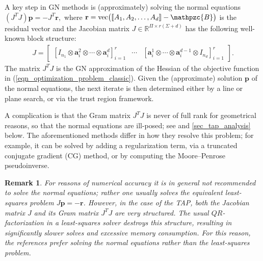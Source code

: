 \documentclass[a4paper,10pt,final]{siamart1116}
\newcommand{\tensor}[1]{\mathpzc{#1}}
\newcommand{\vect}[1]{\mathbf{#1}}
\newcommand{\sten}[3]{\vect{#1}_{#2}^{#3}}
\newcommand{\R}{\mathbb{R}}
\newcommand{\refeqn}[1]{{(\ref{#1})}}
\newcommand{\refsec}[1]{{\cref{#1}}}
\newtheorem{remark}[theorem]{Remark}
\numberwithin{equation}{section}
\numberwithin{figure}{section}
\numberwithin{table}{section}
\numberwithin{theorem}{section}
\begin{document}
A key step in GN methods is (approximately) solving the normal equations
\(
 (J^T J) \vect{p} = -J^T \vect{r},
\)
where $\vect{r} = \operatorname{vec}\bigl( {\text\textlbrackdbl} A_1, A_2, \ldots, A_d {\text\textrbrackdbl} - \tensor{B} \bigr)$ is the residual vector and the Jacobian matrix $J \in \R^{\Pi \times r(\Sigma+d)}$ has the following well-known block structure:
\begin{align}\label{eqn_overparam_jacobian}
J =
\begin{bmatrix}
[I_{n_1} \otimes \sten{a}{i}{2} \otimes \cdots \otimes \sten{a}{i}{d}]_{i=1}^r & \cdots & [\sten{a}{i}{1} \otimes \cdots \otimes \sten{a}{i}{d-1} \otimes I_{n_d}]_{i=1}^r
\end{bmatrix}.
\end{align}
The matrix $J^T J$ is the GN approximation of the Hessian of the objective function in \refeqn{eqn_optimization_problem_classic}. Given the (approximate) solution $\vect{p}$ of the normal equations, the next iterate is then determined either by a line or plane search, or via the trust region framework.

A complication is that the Gram matrix $J^TJ$ is never of full rank for geometrical reasons, so that the normal equations are ill-posed; see \cite[section 2]{V2017} and \refsec{sec_tap_analysis} below. The aforementioned methods differ in how they resolve this problem; for example, it can be solved by adding a regularization term, via a truncated conjugate gradient (CG) method, or by computing the Moore--Penrose pseudoinverse.

\begin{remark}\label{rem_numerical_accuracy}
For reasons of numerical accuracy it is in general not recommended to solve the normal equations; rather one usually solves the equivalent least-squares problem $J \vect{p} = -\vect{r}$. However, in the case of the TAP, both the Jacobian matrix $J$ and its Gram matrix $J^T J$ are very structured. The usual $QR$-factorization in a least-squares solver destroys this structure, resulting in significantly slower solves and excessive memory consumption. For this reason, the references \cite{Acar2011,Hayashi1982,Paatero1999,Paatero1997,Phan2013a,Sorber2013a,Tomasi2006} prefer solving the normal equations rather than the least-squares problem.
\end{remark}
\end{document}
